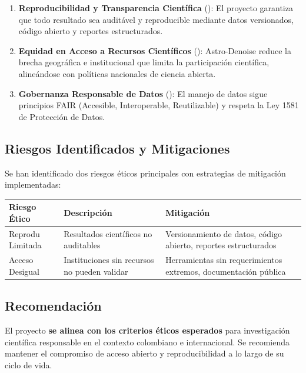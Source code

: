 \begin{enumerate}
    \item \textbf{Reproducibilidad y Transparencia Científica} (\cite{unesco2021}): El proyecto garantiza que todo resultado sea auditável y reproducible mediante datos versionados, código abierto y reportes estructurados.
    
    \item \textbf{Equidad en Acceso a Recursos Científicos} (\cite{minciencias2022}): Astro-Denoise reduce la brecha geográfica e institucional que limita la participación científica, alineándose con políticas nacionales de ciencia abierta.
    
    \item \textbf{Gobernanza Responsable de Datos} (\cite{wilkinson2016}): El manejo de datos sigue principios FAIR (Accesible, Interoperable, Reutilizable) y respeta la Ley 1581 de Protección de Datos.
\end{enumerate}

\subsection*{Riesgos Identificados y Mitigaciones}

Se han identificado dos riesgos éticos principales con estrategias de mitigación implementadas:

\begin{table}[H]
\centering
\small
\begin{tabular}{|p{3cm}|p{3cm}|p{3cm}|}
\hline
\textbf{Riesgo Ético} & \textbf{Descripción} & \textbf{Mitigación} \\
\hline
Reprodu Limitada & Resultados científicos no auditables & Versionamiento de datos, código abierto, reportes estructurados \\
\hline
Acceso Desigual & Instituciones sin recursos no pueden validar & Herramientas sin requerimientos extremos, documentación pública \\
\hline
\end{tabular}
\end{table}

\subsection*{Recomendación}

El proyecto \textbf{se alinea con los criterios éticos esperados} para investigación científica responsable en el contexto colombiano e internacional. Se recomienda mantener el compromiso de acceso abierto y reproducibilidad a lo largo de su ciclo de vida.
